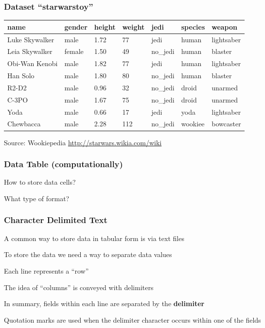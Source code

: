 \documentclass[12pt]{beamer}\usepackage[]{graphicx}\usepackage[]{color}
\begin{document}

\begin{frame}[fragile]
\frametitle{Dataset ``starwarstoy''}

{\scriptsize
\begin{center}
 \begin{tabular}{| l | l | l | l | l | l | l |}
  \hline
name & gender & height & weight & jedi & species & weapon \\
  \hline
Luke Skywalker & male & 1.72 & 77 & jedi & human & lightsaber \\
  \hline
Leia Skywalker & female & 1.50 & 49 & no\_jedi & human & blaster \\
  \hline
Obi-Wan Kenobi & male & 1.82 & 77 & jedi & human & lightsaber \\
  \hline
Han Solo & male & 1.80 & 80 & no\_jedi & human & blaster \\
  \hline
R2-D2 & male & 0.96 & 32 & no\_jedi & droid & unarmed \\
  \hline
C-3PO & male & 1.67 & 75 & no\_jedi & droid & unarmed \\
  \hline
Yoda & male & 0.66 & 17 & jedi & yoda & lightsaber \\
  \hline
Chewbacca & male & 2.28 & 112 & no\_jedi & wookiee & bowcaster \\
  \hline
 \end{tabular}
\end{center}
}

\tiny Source: Wookiepedia \url{http://starwars.wikia.com/wiki}

\end{frame}


\begin{frame}
\frametitle{Data Table (computationally)}

\begin{center}
{\Large How to store data cells?}

\bigskip
{\Large What type of format?}
\end{center}

\end{frame}


\begin{frame}
\frametitle{Character Delimited Text}

\bi
  \item A common way to store data in tabular form is via text files 
  \item To store the data we need a way to separate data values
  \item Each line represents a ``row''
  \item The idea of ``columns'' is conveyed with delimiters 
  \item In summary, fields within each line are separated by the \textbf{delimiter}
  \item Quotation marks are used when the delimiter character occurs within one of the fields
\ei

\end{frame}
\end{document}
